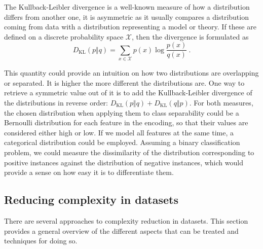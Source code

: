 \documentclass[
	fontsize=11pt, %
	twoside=false, %
	open=any, %
	secnumdepth=1, %
]{kaobook}
\begin{document}
The Kullback-Leibler divergence is a well-known measure of how a distribution differs from another one, it is asymmetric as it usually compares a distribution coming from data with a distribution representing a model or theory. If these are defined on a discrete probability space $\mathcal X$, then the divergence is formulated as
\begin{equation}D_{\operatorname{KL}}(p\Vert q)=\sum_{x\in\mathcal X} p(x)\log\frac{p(x)}{q(x)}~.\end{equation}

This quantity could provide an intuition on how two distributions are overlapping or separated. It is higher the more different the distributions are. One way to retrieve a symmetric value out of it is to add the Kullback-Leibler divergence of the distributions in reverse order: \(D_{\operatorname{KL}}(p\Vert q)+D_{\operatorname{KL}}(q\Vert p)\).
For both measures, the chosen distribution when applying them to class separability could be a Bernoulli distribution for each feature in the encoding, so that their values are considered either high or low. If we model all features at the same time, a categorical distribution could be employed. Assuming a binary classification problem, we could measure the dissimilarity of the distribution corresponding to positive instances against the distribution of negative instances, which would provide a sense on how easy it is to differentiate them.

\subsection{Reducing complexity in datasets}\label{sec.methods}

There are several approaches to complexity reduction in datasets. This section provides a general overview of the different aspects that can be treated and techniques for doing so. %


\end{document}

